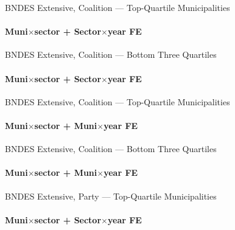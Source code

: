 \documentclass[aspectratio=169,10pt]{beamer}
\newcommand{\tbndes}{../tables/agg_firm_bndes_sector}
\begin{document}

\begin{frame}[t,shrink=5]{BNDES Extensive, Coalition --- Top-Quartile Municipalities}
\framesubtitle{Muni$\times$sector + Sector$\times$year FE}
\begin{center}\footnotesize

\end{center}
\end{frame}

\begin{frame}[t,shrink=5]{BNDES Extensive, Coalition --- Bottom Three Quartiles}
\framesubtitle{Muni$\times$sector + Sector$\times$year FE}
\begin{center}\footnotesize

\end{center}
\end{frame}

\begin{frame}[t,shrink=5]{BNDES Extensive, Coalition --- Top-Quartile Municipalities}
\framesubtitle{Muni$\times$sector + Muni$\times$year FE}
\begin{center}\footnotesize

\end{center}
\end{frame}

\begin{frame}[t,shrink=5]{BNDES Extensive, Coalition --- Bottom Three Quartiles}
\framesubtitle{Muni$\times$sector + Muni$\times$year FE}
\begin{center}\footnotesize

\end{center}
\end{frame}


\begin{frame}[t,shrink=5]{BNDES Extensive, Party --- Top-Quartile Municipalities}
\framesubtitle{Muni$\times$sector + Sector$\times$year FE}
\begin{center}\footnotesize

\end{center}
\end{frame}
\end{document}
